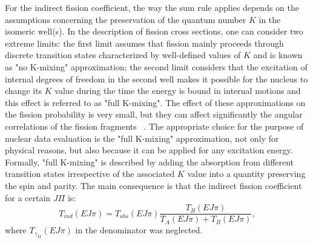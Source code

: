 \documentclass[twocolumn,amsmath,amssymb,10pt,groupedaddress,a4paper]{revtex4}
\begin{document}
For the indirect fission coefficient, the way the sum rule applies depends on the assumptions
concerning the preservation of the quantum number $K$ in the isomeric well(s).
In the description of fission cross sections, one can consider two extreme
limits: the first limit assumes that fission mainly proceeds through discrete
transition states characterized by well-defined values of $K$ and is known as
"no K-mixing" approximation; the second limit considers that the excitation of
internal degrees of freedom in the second well makes it possible for the
nucleus to change its $K$ value during the time the energy is bound in
internal motions and this effect is referred to as "full K-mixing". The effect
of these approximations on the fission probability is very small, but they can
affect significantly the angular correlations of the fission fragments
~\cite{Back:74}. The appropriate choice for the purpose of nuclear data
evaluation is the "full K-mixing" approximation, not only for physical
reasons, but also because it can be applied for any excitation energy.
Formally, "full K-mixing" is described by adding the absorption from different
transition states irrespective of the associated $K$ value into a quantity
preserving the spin and parity. The main consequence is that the indirect fission
coefficient for a certain $J\Pi$ is:
%
\begin{equation}
T_{ind}(E J \pi)=T_{abs}(E J \pi)\frac{T_{B}(E J \pi)}{T_{A}(E J \pi)+T_{B}(E J \pi)},
\label{tind1}
\end{equation}
%
where $T_{\gamma_{II}}(E J \pi)$ in the denominator was neglected.
\end{document}
